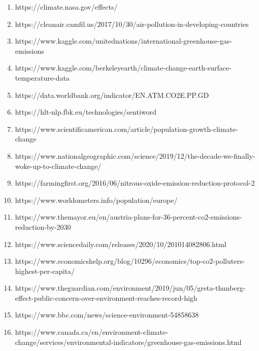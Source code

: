 \documentclass[a4paper, 11pt]{report}
\begin{document}
\begin{itemize}
\begin{enumerate}
    \item https://climate.nasa.gov/effects/

    \item https://cleanair.camfil.us/2017/10/30/air-pollution-in-developing-countries

    \item  https://www.kaggle.com/unitednations/international-greenhouse-gas-emissions

    \item  https://www.kaggle.com/berkeleyearth/climate-change-earth-surface-temperature-data

    \item  https://data.worldbank.org/indicator/EN.ATM.CO2E.PP.GD

    \item https://hlt-nlp.fbk.eu/technologies/sentiword

    \item https://www.scientificamerican.com/article/population-growth-climate-change

    \item https://www.nationalgeographic.com/science/2019/12/the-decade-we-finally-woke-up-to-climate-change/

    \item https://farmingfirst.org/2016/06/nitrous-oxide-emission-reduction-protocol-2

    \item https://www.worldometers.info/population/europe/

    \item https://www.themayor.eu/en/austria-plans-for-36-percent-co2-emissions-reduction-by-2030

    \item https://www.sciencedaily.com/releases/2020/10/201014082806.html

    \item https://www.economicshelp.org/blog/10296/economics/top-co2-polluters-highest-per-capita/

    \item https://www.theguardian.com/environment/2019/jun/05/greta-thunberg-effect-public-concern-over-environment-reaches-record-high

    \item https://www.bbc.com/news/science-environment-54858638

    \item https://www.canada.ca/en/environment-climate-change/services/environmental-indicators/greenhouse-gas-emissions.html


\end{enumerate}
\end{itemize}
\end{document}
